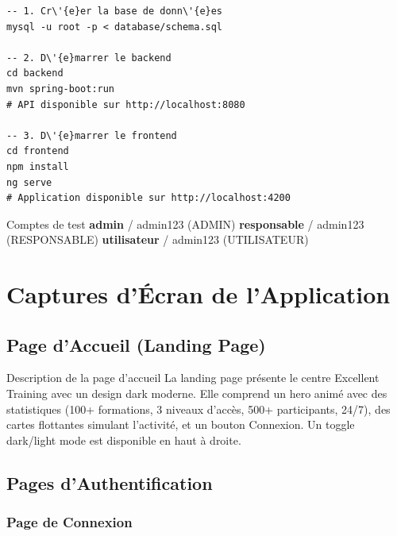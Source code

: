 \documentclass[12pt,a4paper]{report}
\begin{document}
\begin{lstlisting}[style=sqlstyle, caption={Commandes de d\'{e}marrage}]
-- 1. Cr\'{e}er la base de donn\'{e}es
mysql -u root -p < database/schema.sql

-- 2. D\'{e}marrer le backend
cd backend
mvn spring-boot:run
# API disponible sur http://localhost:8080

-- 3. D\'{e}marrer le frontend
cd frontend
npm install
ng serve
# Application disponible sur http://localhost:4200
\end{lstlisting}

\begin{infobox}{Comptes de test}
  \textbf{admin} / admin123 (ADMIN) \quad \textbullet{} \quad
  \textbf{responsable} / admin123 (RESPONSABLE) \quad \textbullet{} \quad
  \textbf{utilisateur} / admin123 (UTILISATEUR)
\end{infobox}

\clearpage

\clearpage
\chapter{Captures d'\'{E}cran de l'Application}

\section{Page d'Accueil (Landing Page)}

\begin{infobox}{Description de la page d'accueil}
La landing page pr\'{e}sente le centre Excellent Training avec un design dark moderne. Elle comprend un hero anim\'{e} avec des statistiques (100+ formations, 3 niveaux d'acc\`{e}s, 500+ participants, 24/7), des cartes flottantes simulant l'activit\'{e}, et un bouton Connexion. Un toggle dark/light mode est disponible en haut \`{a} droite.
\end{infobox}

\section{Pages d'Authentification}

\subsection{Page de Connexion}
\end{document}
